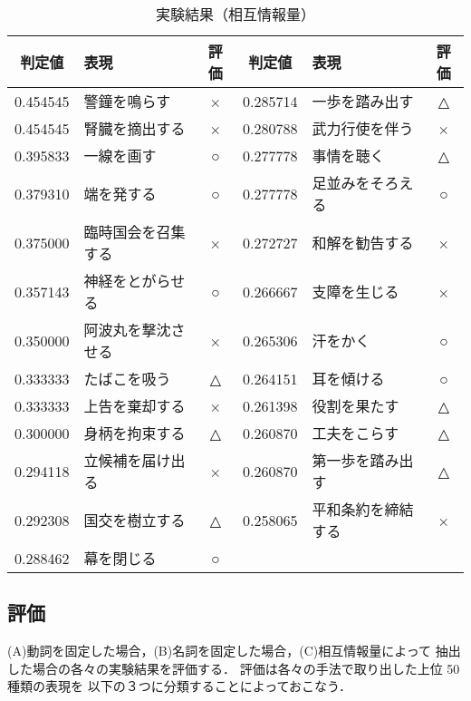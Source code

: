 \addtocounter{table}{2}

\bigskip

\bigskip


\begin{table}[htbp]
  \begin{center}
    \begin{tabular}{|c|l|c||c|l|c|} \hline
判定値 &  表現  &  評価 & 判定値 &  表現  &  評価 \\  \hline \hline
0.454545  &  警鐘を鳴らす   & ×  & 0.285714  &  一歩を踏み出す   & △ \\ \hline
0.454545  &  腎臓を摘出する & ×  & 0.280788  &  武力行使を伴う   & × \\ \hline
0.395833  &  一線を画す     & ○  & 0.277778  &  事情を聴く       & △ \\ \hline
0.379310  &  端を発する     & ○  & 0.277778  &  足並みをそろえる & ○ \\ \hline
0.375000  &  臨時国会を召集する & × & 0.272727  &  和解を勧告する   & × \\ \hline
0.357143  &  神経をとがらせる   & ○ & 0.266667  &  支障を生じる     & × \\ \hline
0.350000  &  阿波丸を撃沈させる & × & 0.265306  &  汗をかく         & ○ \\ \hline
0.333333  &  たばこを吸う     & △ & 0.264151  &  耳を傾ける       & ○ \\ \hline
0.333333  &  上告を棄却する   & × & 0.261398  &  役割を果たす     & △ \\ \hline
0.300000  &  身柄を拘束する   & △ & 0.260870  &  工夫をこらす     & △ \\ \hline
0.294118  &  立候補を届け出る & × & 0.260870  &  第一歩を踏み出す & △ \\ \hline
0.292308  &  国交を樹立する   & △ & 0.258065  &  平和条約を締結する & × \\ \hline
0.288462  &  幕を閉じる       & ○ &           &                     &    \\ \hline
    \end{tabular}
  \end{center}
  \caption{実験結果（相互情報量）}
\end{table}

\subsection{評価}

(A)動詞を固定した場合，(B)名詞を固定した場合，(C)相互情報量によって
抽出した場合の各々の実験結果を評価する．
評価は各々の手法で取り出した上位 50 種類の表現を
以下の３つに分類することによっておこなう．

